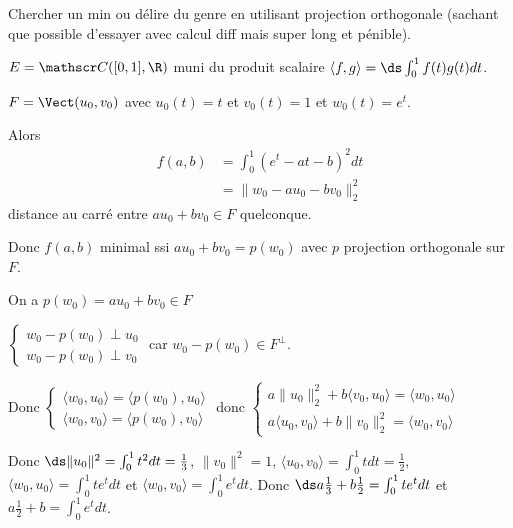 \begin{exemple}
    Chercher un min ou délire du genre en utilisant projection orthogonale (sachant que possible
    d'essayer avec calcul diff mais super long et pénible).

    $E = \mathscr C([0, 1], \R)$ muni du produit scalaire $\langle f, g \rangle = \ds \int_0^1 f(t)g(t) dt$.

    $F = \Vect (u_0, v_0)$ avec $u_0(t) = t$ et $v_0(t) = 1$ et $w_0(t) = e^t$. 

    Alors 
    \begin{align}
        f(a, b) & = \int_0^1 (e^t -at - b)^2 dt \\
        & = \| w_0 - au_0 - bv_0 \|_2^2 
    \end{align}
    distance au carré entre $a u_0 + b v_0 \in F$ quelconque. 

    Donc $f(a, b)$ minimal ssi $au_0 + bv_0 = p(w_0)$ avec $p$ projection orthogonale sur 
    $F$. 

    On a $p(w_0) = a u_0 + b v_0 \in F$

    $\begin{cases}
        w_0 - p(w_0) \perp u_0 \\
        w_0 - p(w_0) \perp v_0
    \end{cases}$ 
    car $w_0 - p(w_0) \in F^\perp$.

    Donc $\begin{cases}
        \langle w_0, u_0 \rangle = \langle p(w_0), u_0 \rangle \\
        \langle w_0, v_0 \rangle = \langle p(w_0), v_0 \rangle
    \end{cases}$
    donc $\begin{cases}
        a \|u_0\|_2^2 + b \langle v_0, u_0 \rangle = \langle w_0, u_0 \rangle \\
        a \langle u_0, v_0 \rangle + b \|v_0\|_2^2 = \langle w_0, v_0 \rangle
    \end{cases}$

    Donc $\ds \| u_0 \|^2 = \int_0^1 t^2 dt = \frac{1}{3}$, $\| v_0 \|^2 = 1$, $\langle u_0, v_0 \rangle = \int_0^1 t dt = \frac{1}{2}$, $\langle w_0, u_0 \rangle = \int_0^1 t e^t dt$ et $\langle w_0, v_0 \rangle = \int_0^1 e^t dt$.
    Donc $\ds a \frac{1}{3} + b \frac{1}{2} = \int_0^1 t e^t dt$ et $a \frac{1}{2} + b = \int_0^1 e^t dt$.

\end{exemple}

